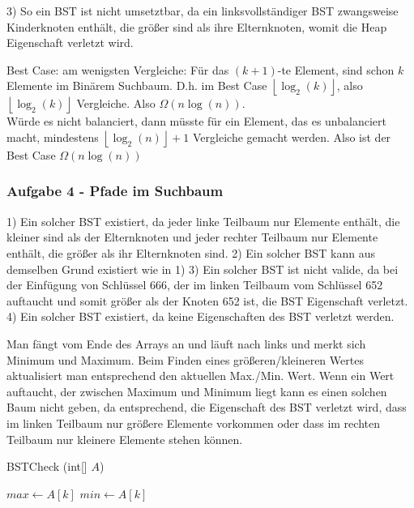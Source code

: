 \documentclass[11pt]{scrartcl}
\newcommand{\task}[1]{\subsubsection*{#1}}
\newcommand{\subtask}[1]{\marginnote{#1)}}
\begin{document}
    3) So ein BST ist nicht umsetztbar, da ein linksvollständiger BST zwangsweise Kinderknoten enthält, die größer sind als ihre Elternknoten, womit die Heap Eigenschaft verletzt wird.

    \subtask{b}
    Best Case: am wenigsten Vergleiche: Für das $ (k + 1) $-te Element, sind schon $ k $ Elemente im Binärem Suchbaum.
    D.h. im Best Case $ \left\lfloor \log _2(k) \right\rfloor $, also $ \left\lfloor \log _2(k) \right\rfloor  $ Vergleiche.
    Also $ \Omega( n \log (n) ) $.\\
    Würde es nicht balanciert, dann müsste für ein Element, das es unbalanciert macht, mindestens $ \left\lfloor \log _2(n) \right\rfloor + 1 $ Vergleiche gemacht werden.
    Also ist der Best Case $ \Omega(n \log(n)) $

    \newpage
    \task{Aufgabe 4 - Pfade im Suchbaum}

    \subtask{a}
    1) Ein solcher BST existiert, da jeder linke Teilbaum nur Elemente enthält, die kleiner sind als der Elternknoten und jeder rechter Teilbaum nur Elemente enthält, die größer als ihr Elternknoten sind.
    2) Ein solcher BST kann aus demselben Grund existiert wie in 1)
    3) Ein solcher BST ist nicht valide, da bei der Einfügung von Schlüssel 666, der im linken Teilbaum vom Schlüssel 652 auftaucht und somit größer als der Knoten 652 ist, die BST Eigenschaft verletzt.
    4) Ein solcher BST existiert, da keine Eigenschaften des BST verletzt werden.

    \subtask{b}
    Man fängt vom Ende des Arrays an und läuft nach links und merkt sich Minimum und Maximum. Beim Finden eines größeren/kleineren Wertes aktualisiert man entsprechend den aktuellen Max./Min. Wert. Wenn ein Wert auftaucht, der zwischen Maximum und Minimum liegt kann es einen solchen Baum nicht geben, da entsprechend, die Eigenschaft des BST verletzt wird, dass im linken Teilbaum nur größere Elemente vorkommen oder dass im rechten Teilbaum nur kleinere Elemente stehen können.

    \begin{algorithm}[H]
    \caption{BSTCheck (int[] $A$)}
    $max \leftarrow A[k]$\;
    $min \leftarrow A[k]$\;
\end{algorithm}
\end{document}
